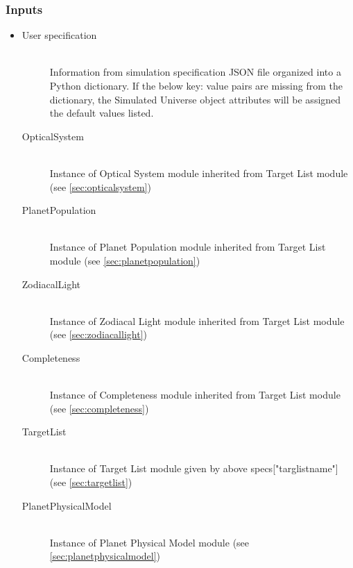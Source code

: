 \documentclass[cleanfoot]{asme2ej}
\begin{document}
\subsubsection*{Inputs}
\begin{itemize}
    \item 
    \begin{description}
        \item[User specification] \hfill \\
        Information from simulation specification JSON file organized into a Python dictionary. If the below key: value pairs are missing from the dictionary, the Simulated Universe object attributes will be assigned the default values listed.
        \item[OpticalSystem] \hfill \\
        Instance of Optical System module inherited from Target List module (see \ref{sec:opticalsystem})
        \item[PlanetPopulation] \hfill \\
        Instance of Planet Population module inherited from Target List module (see \ref{sec:planetpopulation})
        \item[ZodiacalLight] \hfill \\
        Instance of Zodiacal Light module inherited from Target List module (see \ref{sec:zodiacallight})
        \item[Completeness] \hfill \\
        Instance of Completeness module inherited from Target List module (see \ref{sec:completeness})
        \item[TargetList] \hfill \\
        Instance of Target List module given by above specs["targlistname"] (see \ref{sec:targetlist})
        \item[PlanetPhysicalModel] \hfill \\
        Instance of Planet Physical Model module (see \ref{sec:planetphysicalmodel})
    \end{description}
\end{itemize}
\end{document}
